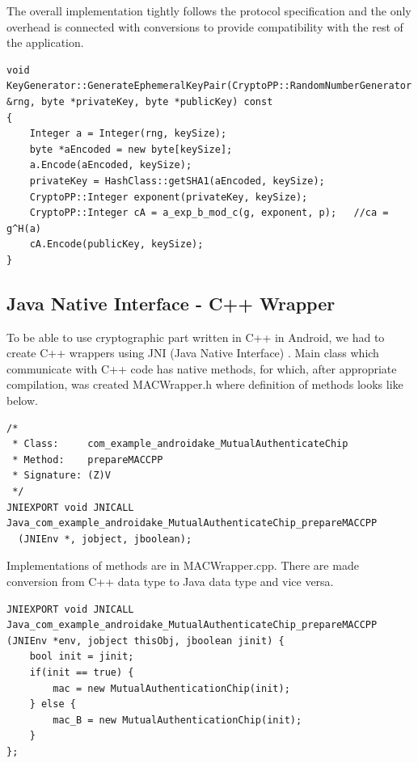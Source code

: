 \documentclass[11pt,titlepage]{article}
\theoremstyle{plain}
\begin{document}
The overall implementation tightly follows the protocol specification and the only overhead is connected with conversions to provide compatibility with the rest of the application.
\begin{lstlisting}
void KeyGenerator::GenerateEphemeralKeyPair(CryptoPP::RandomNumberGenerator &rng, byte *privateKey, byte *publicKey) const
{
    Integer a = Integer(rng, keySize);
    byte *aEncoded = new byte[keySize];
    a.Encode(aEncoded, keySize);
    privateKey = HashClass::getSHA1(aEncoded, keySize);
    CryptoPP::Integer exponent(privateKey, keySize);
    CryptoPP::Integer cA = a_exp_b_mod_c(g, exponent, p);   //ca = g^H(a)
    cA.Encode(publicKey, keySize);
}
\end{lstlisting}

\subsection{Java Native Interface - C++ Wrapper}

To be able to use cryptographic part written in C++ in Android, we had to create C++ wrappers using JNI (Java Native Interface) \cite{JNI}. Main class which communicate with C++ code has native methods, for which, after appropriate compilation, was created MACWrapper.h where definition of methods looks like below.

\begin{lstlisting}
/*
 * Class:     com_example_androidake_MutualAuthenticateChip
 * Method:    prepareMACCPP
 * Signature: (Z)V
 */
JNIEXPORT void JNICALL Java_com_example_androidake_MutualAuthenticateChip_prepareMACCPP
  (JNIEnv *, jobject, jboolean);
\end{lstlisting}

Implementations of methods are in MACWrapper.cpp. There are made conversion from C++ data type to Java data type and vice versa.

\begin{lstlisting}
JNIEXPORT void JNICALL Java_com_example_androidake_MutualAuthenticateChip_prepareMACCPP
(JNIEnv *env, jobject thisObj, jboolean jinit) {
	bool init = jinit;
	if(init == true) {
		mac = new MutualAuthenticationChip(init);
	} else {
		mac_B = new MutualAuthenticationChip(init);
	}
};
\end{lstlisting}
\end{document}
